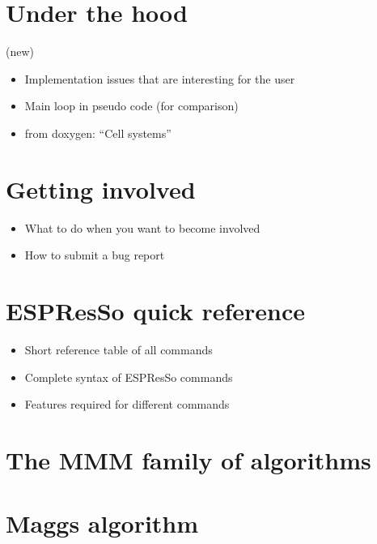 \documentclass[
a4paper,                        %
11pt,                           %
twoside,                        %
footsepline,                    %
headsepline,                    %
headexclude,                    %
footexclude,                    %
pagesize,                       %
bibtotocnumbered,               %
idxtotoc                        %
]{scrreprt}
\newcommand{\es}{\textsf{ESPResSo}}
\begin{document}


\chapter{Under the hood}
\label{chap:underhood}

(new)

\begin{itemize}
\item Implementation issues that are interesting for the user
\item Main loop in pseudo code (for comparison)
\item from doxygen: ``Cell systems'' 
\end{itemize}


\chapter{Getting involved}
\label{chap:devel}

\begin{itemize}
\item What to do when you want to become involved
\item How to submit a bug report
\end{itemize}


\appendix
\chapter{\es{} quick reference}
\label{chap:quickref}

\begin{itemize}
\item Short reference table of all commands
\item Complete syntax of \es{} commands
\item Features required for different commands
\end{itemize}

\chapter{The MMM family of algorithms}
\label{chap:mmm}

\chapter{Maggs algorithm}
\label{chap:maggs}

\printindex
\end{document}
